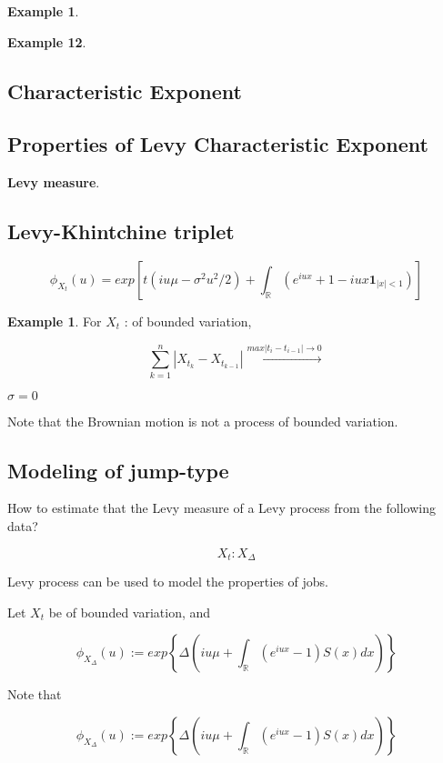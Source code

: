\documentclass[12pt]{article}
\theoremstyle{nonumberbreak}
\begin{document}
\textbf{Example 1}. 




\textbf{Example 12}. 


\subsection{Characteristic Exponent}





\subsection{Properties of Levy Characteristic Exponent}

\textbf{Levy measure}. 


\subsection{Levy-Khintchine triplet}


$$
\phi_{X_t}(u) = exp \left[ t (iu\mu - \sigma^2 u^2 /2) + \int_\mathbb{R} \left( e^{iux} + 1 - iux \mathbf{1}_{|x| < 1} \right) \right]
$$

\textbf{Example 1}. For $X_t$ : of bounded variation,

$$
\sum_{k=1}^n | X_{t_k} - X_{t_{k-1}} |  \overset{max |t_i - t_{i-1}| \to 0}{\to} 
$$


$\sigma=0$

Note that the Brownian motion is not a process of bounded variation.




\subsection{Modeling of jump-type}

How to estimate that the Levy measure of a Levy process from the following data? 

$$
X_t: X_\Delta
$$


Levy process can be used to model the properties of jobs. 


Let $X_t$ be of bounded variation, and 

$$
\phi_{X_\Delta} (u) := exp \left\{  \Delta \left( iu\mu + \int_\mathbb{R} (e^{iux} - 1) S(x) dx \right)  \right\}
$$

Note that 

$$
\phi_{X_\Delta} (u) := exp \left\{  \Delta \left( iu\mu + \int_\mathbb{R} (e^{iux} - 1) S(x) dx \right)  \right\}
$$
\end{document}
